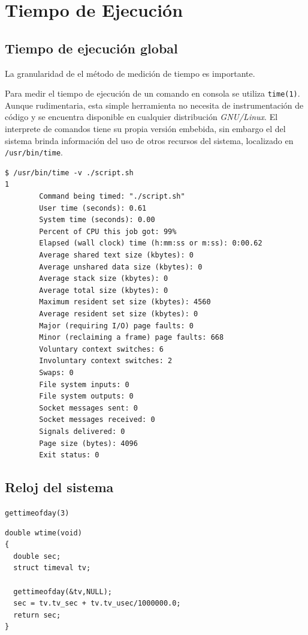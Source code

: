 \documentclass[a4paper]{report}
\begin{document}
\section{Tiempo de Ejecución}

\subsection{Tiempo de ejecución global}

La granularidad de el método de medición de tiempo es importante.

\bigskip

Para medir el tiempo de ejecución de un comando en consola se utiliza {\tt time(1)}.
Aunque rudimentaria, esta simple herramienta no necesita de instrumentación de código y se encuentra disponible en cualquier distribución {\it  GNU/Linux}.
El interprete de comandos tiene su propia versión embebida, sin embargo el del sistema brinda información del uso de otros recursos del sistema, localizado en {\tt /usr/bin/time}.

\bigskip

\begin{lstlisting}
$ /usr/bin/time -v ./script.sh
1
        Command being timed: "./script.sh"
        User time (seconds): 0.61
        System time (seconds): 0.00
        Percent of CPU this job got: 99%
        Elapsed (wall clock) time (h:mm:ss or m:ss): 0:00.62
        Average shared text size (kbytes): 0
        Average unshared data size (kbytes): 0
        Average stack size (kbytes): 0
        Average total size (kbytes): 0
        Maximum resident set size (kbytes): 4560
        Average resident set size (kbytes): 0
        Major (requiring I/O) page faults: 0
        Minor (reclaiming a frame) page faults: 668
        Voluntary context switches: 6
        Involuntary context switches: 2
        Swaps: 0
        File system inputs: 0
        File system outputs: 0
        Socket messages sent: 0
        Socket messages received: 0
        Signals delivered: 0
        Page size (bytes): 4096
        Exit status: 0
\end{lstlisting}

\subsection{Reloj del sistema}

{\tt gettimeofday(3)}

\begin{lstlisting}
double wtime(void)
{
  double sec;
  struct timeval tv;
  
  gettimeofday(&tv,NULL);
  sec = tv.tv_sec + tv.tv_usec/1000000.0;
  return sec;
}
\end{lstlisting}
\end{document}

